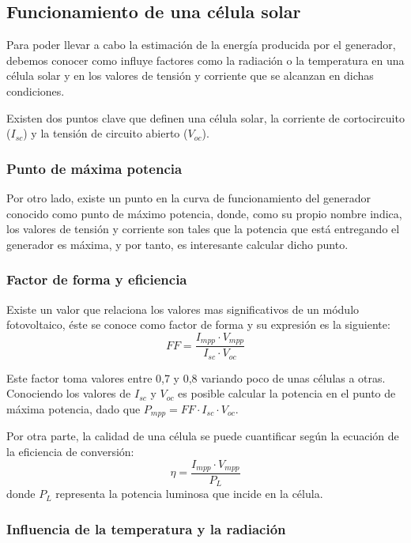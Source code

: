 \subsection{Funcionamiento de una célula solar}

Para poder llevar a cabo la estimación de la energía producida por el generador, debemos conocer como influye factores como la radiación o la temperatura en una célula solar y en los valores de tensión y corriente que se alcanzan en dichas condiciones.

Existen dos puntos clave que definen una célula solar, la corriente de cortocircuito ($I_{sc}$) y la tensión de circuito abierto ($V_{oc}$). 

\subsubsection{Punto de máxima potencia}

Por otro lado, existe un punto en la curva de funcionamiento del generador conocido como punto de máximo potencia, donde, como su propio nombre indica, los valores de tensión y corriente son tales que la potencia que está entregando el generador es máxima, y por tanto, es interesante calcular dicho punto.

\subsubsection{Factor de forma y eficiencia}

Existe un valor que relaciona los valores mas significativos de un módulo fotovoltaico, éste se conoce como factor de forma y su expresión es la siguiente:
\begin{equation}
\label{eqn:FF}
FF = \frac{I_{mpp} \cdot V_{mpp}}{I_{sc} \cdot V_{oc}}
\end{equation}

Este factor toma valores entre 0,7 y 0,8 variando poco de unas células a otras. Conociendo los valores de $I_{sc}$ y $V_{oc}$ es posible calcular la potencia en el punto de máxima potencia, dado que $P_{mpp}=FF \cdot I_{sc} \cdot V_{oc}$.

Por otra parte, la calidad de una célula se puede cuantificar según la ecuación de la eficiencia de conversión:
\begin{equation}
\eta = \frac{I_{mpp} \cdot V_{mpp}}{P_L}
\end{equation}
donde $P_L$ representa la potencia luminosa que incide en la célula.

\subsubsection{Influencia de la temperatura y la radiación}

